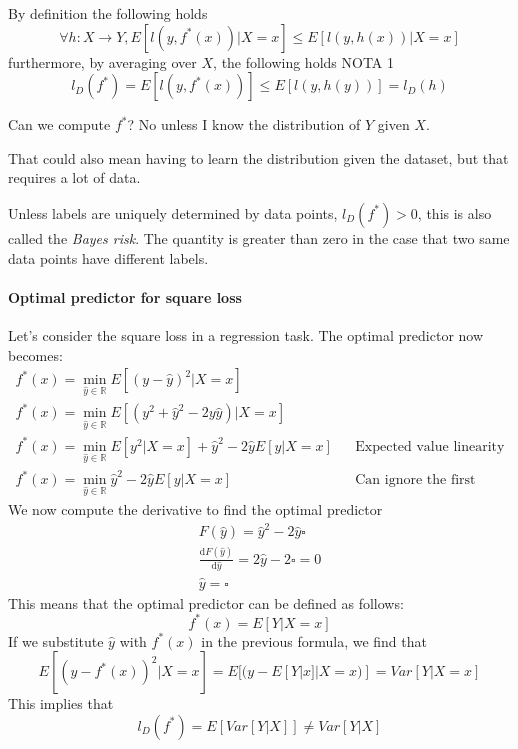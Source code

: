 By definition the following holds
$$\forall h : X \rightarrow Y, E[l(y, f^*(x))|X = x] \leq E[l(y, h(x))|X = x]$$
furthermore, by averaging over $X$, the following holds NOTA 1
$$l_D(f^*) = E[l(y,f^*(x))] \leq E[l(y,h(y))] = l_D(h)$$

Can we compute $f^*$? No unless I know the distribution of $Y$ given $X$. 
\begin{remark}
    That could also mean having to learn the distribution given the dataset, 
    but that requires a lot of data.
\end{remark}
Unless labels are uniquely determined by data points, $l_D(f^*) > 0$, this is also called the 
\emph{Bayes risk}.
The quantity is greater than zero in the case that two same data points have different labels.

\paragraph{Optimal predictor for square loss}
Let's consider the square loss in a regression task.
The optimal predictor now becomes: 
\begin{equation}
    \begin{aligned}
        f^*(x) = \min_{\hat{y} \in \mathbb{R}} E[(y - \hat{y})^2 | X = x]\\
        f^*(x) = \min_{\hat{y} \in \mathbb{R}} E[(y^2 + \hat{y}^2 - 2y\hat{y}) | X = x]\\
        f^*(x) = \min_{\hat{y} \in \mathbb{R}} E[y^2| X = x] + \hat{y}^2 - 2\hat{y}E[y | X = x] && \text{Expected value linearity}\\
        f^*(x) = \min_{\hat{y} \in \mathbb{R}} \hat{y}^2 - 2\hat{y}E[y | X = x] && \text{Can ignore the first}
    \end{aligned}
\end{equation}
We now compute the derivative to find the optimal predictor
\begin{equation}
    \begin{aligned}
        F(\hat{y}) = \hat{y}^2 - 2\hat{y}\square\\
        \frac{\mathrm{d}F(\hat{y})}{\mathrm{d}\hat{y}} = 2\hat{y} - 2\square = 0\\
        \hat{y} = \square
    \end{aligned}
\end{equation}
This means that the optimal predictor can be defined as follows:
$$f^*(x) = E[Y | X = x]$$
If we substitute $\hat{y}$ with $f^*(x)$ in the previous formula, we find that
$$E[(y - f^*(x))^2|X=x] = E[(y - E[Y | x] | X = x)] = \mathit{Var}[Y | X = x]$$
This implies that 
$$l_D(f^*) = E[\mathit{Var}[Y | X]] \neq \mathit{Var}[Y | X]$$

